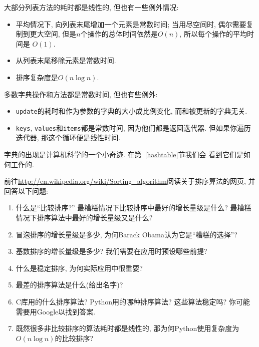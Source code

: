 \documentclass[10pt]{book}
\begin{document}
大部分列表方法的耗时都是线性的, 但也有一些例外情况:

\begin{itemize}

\item 平均情况下, 向列表末尾增加一个元素是常数时间;
当用尽空间时, 偶尔需要复制到更大空间, 
但是$n$个操作的总体时间依然是$O(n)$, 所以每个操作的平均时间是
$O(1)$. 

\item 从列表末尾移除元素是常数时间.

\item 排序复杂度是$O(n \log n)$.

\end{itemize}

多数字典操作和方法都是常数时间, 但也有些例外:

\begin{itemize}

\item {\tt update}的耗时和作为参数的字典的大小成比例变化, 而和被更新的字典无关. 

\item {\tt keys}, {\tt values}和{\tt items}都是常数时间, 因为他们都是返回迭代器. 
但如果你遍历迭代器, 那这个循环便是线性时间. 

\end{itemize}

字典的出现是计算机科学的一个小奇迹. 在第~\ref{hashtable}节我们会
看到它们是如何工作的. 

\begin{exercise}

前往\url{http://en.wikipedia.org/wiki/Sorting_algorithm}阅读关于排序算法的网页, 
并回答以下问题:

\begin{enumerate}

\item 什么是``比较排序?'' 最糟糕情况下比较排序中最好的增长量级是什么? 
最糟糕情况下排序算法中最好的增长量级又是什么?

\item 冒泡排序的增长量级是多少, 为何Barack Obama认为它是``糟糕的选择''?

\item 基数排序的增长量级是多少? 我们需要在应用时预设哪些前提?

\item 什么是稳定排序, 为何实际应用中很重要?

\item 最差的排序算法是什么(给出名字)?

\item C库用的什么排序算法? Python用的哪种排序算法? 这些算法稳定吗?
你可能需要用Google以找到答案.

\item 既然很多非比较排序的算法耗时都是线性的, 
那为何Python使用复杂度为$O(n \log n)$的比较排序?

\end{enumerate}

\end{exercise}
\end{document}
